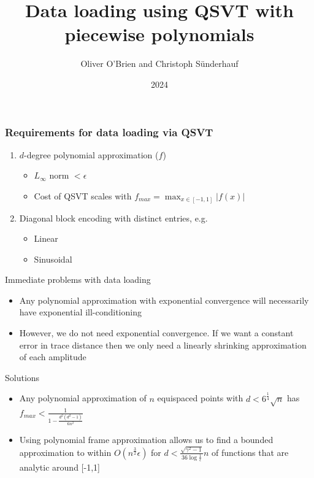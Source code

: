 \documentclass{beamer}
\title{Data loading using QSVT with piecewise polynomials}
\author{Oliver O'Brien and Christoph Sünderhauf}
\institute{Riverlane}
\date{2024}
\begin{document}
\frame{\titlepage}

\begin{frame}
\frametitle{Requirements for data loading via QSVT}
\begin{enumerate}
    \item $d$-degree polynomial approximation ($f$)
    \begin{itemize}
        \item $L_\infty$ norm $ <\epsilon$
        \item Cost of QSVT scales with $f_{max}=\max_{x \in [-1,1]} |f(x)|$
    \end{itemize}
    \item Diagonal block encoding with distinct entries, e.g.
    \begin{itemize}
        \item Linear
        \item Sinusoidal
    \end{itemize}
\end{enumerate}
\end{frame}
\begin{frame}{Immediate problems with data loading}
\begin{itemize}
    \item Any polynomial approximation with exponential convergence will necessarily have exponential ill-conditioning \cite{doi:10.1137/090774707}
    \item However, we do not need exponential convergence. If we want a constant error in trace distance then we only need a linearly shrinking approximation of each amplitude
\end{itemize}
\end{frame}
\begin{frame}{Solutions}
\begin{itemize}
    \item Any polynomial approximation of $n$ equispaced points with $d < 6^{\frac{1}{4}}\sqrt{n}$ has $f_{max} < \frac{1}{1-\frac{d^2(d^2-1)}{6n^2}}$ \cite{Ehlich}
    \item Using polynomial frame approximation allows us to find a bounded approximation to within $O(n^{\frac{3}{2}}\epsilon)$ for $d < \frac{\sqrt{\gamma^2 -1 }}{36 \log\frac{1}{\epsilon}}n$ of functions that are analytic around [-1,1] \cite{adcock2022fast}
\end{itemize}
\end{frame}
\end{document}
